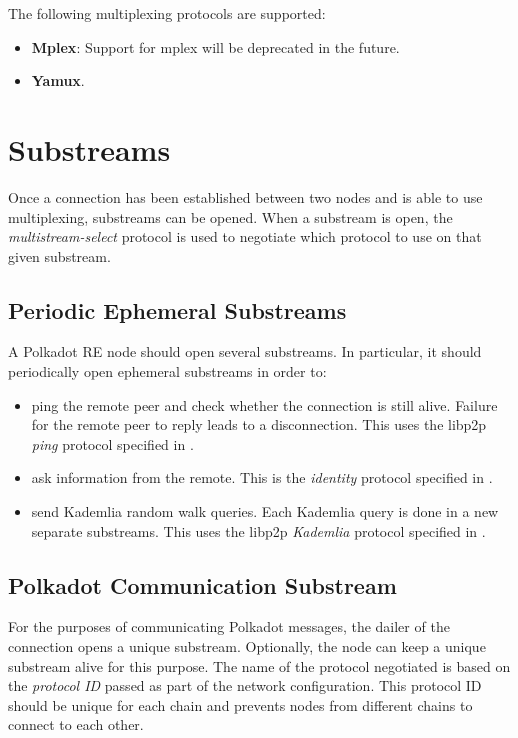\documentclass{book}
\newcommand{\tmem}[1]{{\em #1\/}}
\newcommand{\tmstrong}[1]{\textbf{#1}}
\newcommand{\tmtextbf}[1]{{\bfseries{#1}}}
\newcommand{\tmtextit}[1]{{\itshape{#1}}}
\providecommand{\tmem}[1]{\tmtextit{#1}}
\providecommand{\tmstrong}[1]{\tmtextbf{#1}}
\providecommand{\tmtextbf}[1]{\tmtextbf{#1}}
\providecommand{\tmtextit}[1]{\tmtextit{#1}}
\begin{document}
The following multiplexing protocols are supported:
\begin{itemize}
  \item {\tmstrong{Mplex}}: Support for mplex will be deprecated in the
  future.
  
  \item {\tmstrong{Yamux}}.
\end{itemize}

\section{Substreams}

Once a connection has been established between two nodes and is able to use
multiplexing, substreams can be opened. When a substream is open, the
{\tmem{multistream-select}} protocol is used to negotiate which protocol to
use on that given substream.

\subsection{Periodic Ephemeral Substreams}

A Polkadot RE node should open several substreams. In particular, it should
periodically open ephemeral substreams in order to:
\begin{itemize}
  \item ping the remote peer and check whether the connection is still alive.
  Failure for the remote peer to reply leads to a disconnection. This uses the
  libp2p {\tmem{ping}} protocol specified in
  {\cite{protocol_labs_libp2p_2019}}.
  
  \item ask information from the remote. This is the {\tmem{identity}}
  protocol specified in {\cite{protocol_labs_libp2p_2019}}.
  
  \item send Kademlia random walk queries. Each Kademlia query is done in a
  new separate substreams. This uses the libp2p {\tmem{Kademlia}} protocol
  specified in {\cite{protocol_labs_libp2p_2019}}.
\end{itemize}

\subsection{Polkadot Communication Substream}

For the purposes of communicating Polkadot messages, the dailer of the
connection opens a unique substream. Optionally, the node can keep a unique
substream alive for this purpose. The name of the protocol negotiated is based
on the {\tmem{protocol ID}} passed as part of the network configuration. This
protocol ID should be unique for each chain and prevents nodes from different
chains to connect to each other.
\end{document}
